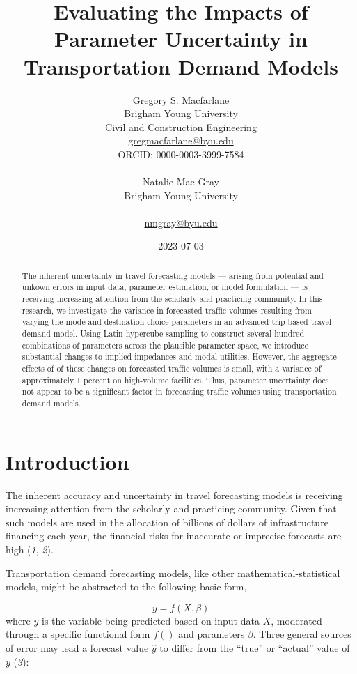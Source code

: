 \documentclass[
  letterpaper,
]{trb}
\title{Evaluating the Impacts of Parameter Uncertainty in Transportation
Demand Models}
\author{
Gregory S. Macfarlane\\Brigham Young University\\Civil and Construction
Engineering\\\href{mailto:gregmacfarlane@byu.edu}{gregmacfarlane@byu.edu}\\ORCID: 0000-0003-3999-7584\\ \\ 
Natalie Mae Gray\\Brigham Young
University\\\\\href{mailto:nmgray@byu.edu}{nmgray@byu.edu}\\}
\date{2023-07-03}
\begin{document}
\maketitle
\newpage
\begin{abstract}
The inherent uncertainty in travel forecasting models --- arising from
potential and unkown errors in input data, parameter estimation, or
model formulation --- is receiving increasing attention from the
scholarly and practicing community. In this research, we investigate the
variance in forecasted traffic volumes resulting from varying the mode
and destination choice parameters in an advanced trip-based travel
demand model. Using Latin hypercube sampling to construct several
hundred combinations of parameters across the plausible parameter space,
we introduce substantial changes to implied impedances and modal
utilities. However, the aggregate effects of of these changes on
forecasted traffic volumes is small, with a variance of approximately 1
percent on high-volume facilities. Thus, parameter uncertainty does not
appear to be a significant factor in forecasting traffic volumes using
transportation demand models.
\end{abstract}
\newpage
\ifdefined\Shaded\renewenvironment{Shaded}{\begin{tcolorbox}[sharp corners, frame hidden, borderline west={3pt}{0pt}{shadecolor}, boxrule=0pt, interior hidden, enhanced, breakable]}{\end{tcolorbox}}\fi


\hypertarget{introduction}{%
\section{Introduction}\label{introduction}}

The inherent accuracy and uncertainty in travel forecasting models is
receiving increasing attention from the scholarly and practicing
community. Given that such models are used in the allocation of billions
of dollars of infrastructure financing each year, the financial risks
for inaccurate or imprecise forecasts are high (\emph{1}, \emph{2}).

Transportation demand forecasting models, like other
mathematical-statistical models, might be abstracted to the following
basic form,

\[
y = f(X, \beta)
\]where \(y\) is the variable being predicted based on input data \(X\),
moderated through a specific functional form \(f()\) and parameters
\(\beta\). Three general sources of error may lead a forecast value
\(\hat{y}\) to differ from the ``true'' or ``actual'' value of \(y\)
(\emph{3}):
\end{document}
